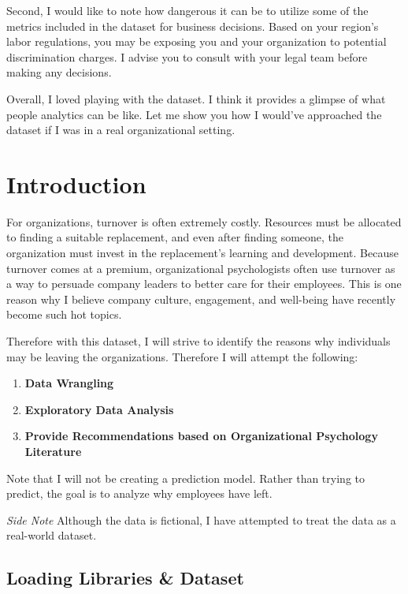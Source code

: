 \documentclass[
]{article}
\providecommand{\tightlist}{%
  \setlength{\itemsep}{0pt}\setlength{\parskip}{0pt}}
\begin{document}
Second, I would like to note how dangerous it can be to utilize some of
the metrics included in the dataset for business decisions. Based on
your region's labor regulations, you may be exposing you and your
organization to potential discrimination charges. I advise you to
consult with your legal team before making any decisions.

Overall, I loved playing with the dataset. I think it provides a glimpse
of what people analytics can be like. Let me show you how I would've
approached the dataset if I was in a real organizational setting.

\hypertarget{introduction}{%
\section{Introduction}\label{introduction}}

For organizations, turnover is often extremely costly. Resources must be
allocated to finding a suitable replacement, and even after finding
someone, the organization must invest in the replacement's learning and
development. Because turnover comes at a premium, organizational
psychologists often use turnover as a way to persuade company leaders to
better care for their employees. This is one reason why I believe
company culture, engagement, and well-being have recently become such
hot topics.

Therefore with this dataset, I will strive to identify the reasons why
individuals may be leaving the organizations. Therefore I will attempt
the following:

\begin{enumerate}
\def\labelenumi{\arabic{enumi}.}
\tightlist
\item
  \textbf{Data Wrangling}
\item
  \textbf{Exploratory Data Analysis}
\item
  \textbf{Provide Recommendations based on Organizational Psychology
  Literature}
\end{enumerate}

Note that I will not be creating a prediction model. Rather than trying
to predict, the goal is to analyze why employees have left.

\emph{Side Note} Although the data is fictional, I have attempted to
treat the data as a real-world dataset.

\hypertarget{loading-libraries-dataset}{%
\subsection{Loading Libraries \&
Dataset}\label{loading-libraries-dataset}}
\end{document}
